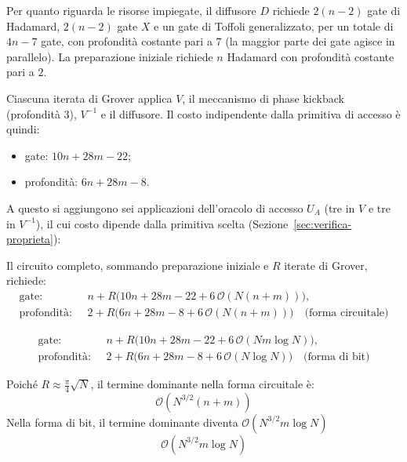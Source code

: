 Per quanto riguarda le risorse impiegate, il diffusore $D$ richiede $2(n-2)$ gate di Hadamard, $2(n-2)$ gate $X$ e un gate di Toffoli generalizzato, per un totale di $4n-7$ gate, con profondità costante pari a $7$ (la maggior parte dei gate agisce in parallelo). La preparazione iniziale richiede $n$ Hadamard con profondità costante pari a $2$.

Ciascuna iterata di Grover applica $V$, il meccanismo di phase kickback (profondità 3), $V^{-1}$ e il diffusore. Il costo indipendente dalla primitiva di accesso è quindi:
\begin{itemize}
  \item gate: $10n + 28m - 22$;
  \item profondità: $6n + 28m - 8$.
\end{itemize}
A questo si aggiungono sei applicazioni dell'oracolo di accesso $U_A$ (tre in $V$ e tre in $V^{-1}$), il cui costo dipende dalla primitiva scelta (Sezione~\ref{sec:verifica-proprieta}):

Il circuito completo, sommando preparazione iniziale e $R$ iterate di Grover, richiede:
\begin{equation}
  \begin{aligned}
    \text{gate: }       & \; n + R\bigl(10n+28m-22 + 6\,\mathcal{O}(N(n+m))\bigr), \\
    \text{profondità: } & \; 2 + R\bigl(6n+28m-8 + 6\,\mathcal{O}(N(n+m))\bigr)
    \quad \text{(forma circuitale)}
  \end{aligned}
\end{equation}

\begin{equation}
  \begin{aligned}
    \text{gate: }       & \; n + R\bigl(10n+28m-22 + 6\,\mathcal{O}(Nm\log N)\bigr), \\
    \text{profondità: } & \; 2 + R\bigl(6n+28m-8 + 6\,\mathcal{O}(N\log N)\bigr)
    \quad \text{(forma di bit)}
  \end{aligned}
\end{equation}

Poiché $R \approx \frac{\pi}{4}\sqrt{N}$, il termine dominante nella forma circuitale è:
\begin{equation}
  \mathcal{O}(N^{3/2}(n+m))
\end{equation}
Nella forma di bit, il termine dominante diventa $\mathcal{O}(N^{3/2}m\log N)$
\begin{equation}
  \mathcal{O}(N^{3/2}m\log N)
\end{equation}

